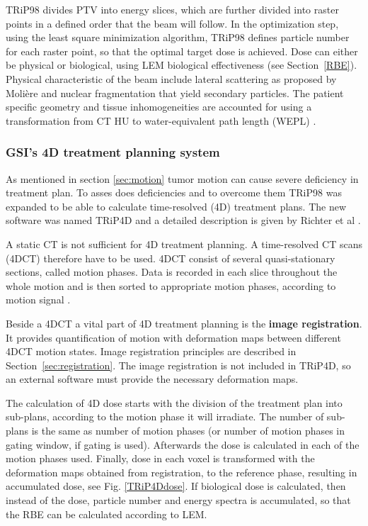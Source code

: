 \documentclass[type=dr, dr=rernat, accentcolor=tud7b,colorbacktitle, bigchapter, openright, twoside, 12pt ]{tudthesis}
\begin{document}
TRiP98 divides PTV into energy slices, which are further divided into raster points in a defined order that the beam will follow. In the optimization step, using the least square minimization
algorithm, TRiP98 defines particle number for each raster point, so that the optimal target dose is achieved. Dose can either be physical or biological, using LEM biological effectiveness (see Section~\ref{RBE}).
Physical characteristic of the beam include lateral scattering as proposed by Moli\`ere \cite{Moliere1948} and nuclear fragmentation that yield secondary particles. The patient specific
geometry and tissue inhomogeneities are accounted for using a transformation from CT HU to water-equivalent path length (WEPL) \cite{Geiss1999,Jaekel2001,Rietzel2007}.


\subsubsection{GSI's 4D treatment planning system}

As mentioned in section \ref{sec:motion} tumor motion can cause severe deficiency in treatment plan. To asses does deficiencies and to overcome them TRiP98 was expanded to be able to calculate time-resolved (4D) treatment plans. The new software was named TRiP4D and a detailed description is given by Richter et al \cite{Richter2013}.

A static CT is not sufficient for 4D treatment planning. A time-resolved CT scans (4DCT) therefore have to be used. 4DCT consist of several quasi-stationary sections, called motion phases. Data is
recorded in each slice throughout the whole motion and is then sorted to appropriate motion phases, according to motion signal \cite{Rietzel2005}.

Beside a 4DCT a vital part of 4D treatment planning is the \textbf{image registration}. It provides quantification of motion with deformation maps between different 4DCT motion states. Image registration principles are described in Section~\ref{sec:registration}. The image registration is not included in TRiP4D, so an external software must provide the necessary
deformation maps.

The calculation of 4D dose starts with the division of the treatment plan into sub-plans, according to the motion phase it will irradiate. The number of sub-plans is the same as number of motion phases (or number of motion phases
in gating window, if gating is used). Afterwards the dose is calculated in each of the motion phases used. Finally, dose in each voxel is transformed with the deformation maps
obtained from registration, to the reference phase, resulting in accumulated dose, see Fig. \ref{TRiP4Ddose}. If biological dose is calculated, then instead of the dose, particle number and energy spectra is accumulated, 
so that the RBE can be calculated according to LEM.
\end{document}
